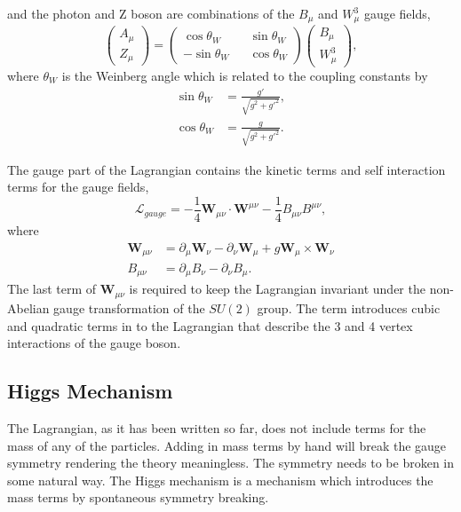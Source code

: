 and the photon and Z boson are combinations of the $B_{\mu}$ and $W^{3}_{\mu}$
gauge fields,
\begin{equation}
\left( \begin{matrix} A_{\mu}\\ Z_{\mu}\end{matrix}\right) =
\left( \begin{matrix} \cos\theta_{W} && \sin\theta_{W} \\  
                      -\sin\theta_{W} && \cos\theta_{W} \end{matrix}\right) 
\left( \begin{matrix} B_{\mu}\\ W^{3}_{\mu}\end{matrix}\right) ,
\label{eq:bgauge}
\end{equation}
where $\theta_{W}$ is the Weinberg angle which is related to the coupling
constants by
\begin{align*}
\sin\theta_{W} &= \frac{g\prime}{\sqrt{g^{2}+g\prime^{2}}},\\
\cos\theta_{W} &= \frac{g}{\sqrt{g^{2}+g\prime^{2}}}.
\end{align*}

The gauge part of the Lagrangian contains the kinetic terms and self interaction
terms for the gauge fields,
\begin{equation}
\mathcal{L}_{gauge} = 
- \frac{1}{4} \mathbf{W}_{\mu\nu} \cdot \mathbf{W}^{\mu\nu}
- \frac{1}{4} B_{\mu\nu} B^{\mu\nu},
\end{equation}
where
\begin{align*}
\mathbf{W}_{\mu\nu} &=
\partial_{\mu} \mathbf{W}_{\nu} -
\partial_{\nu} \mathbf{W}_{\mu} +
g \mathbf{W}_{\mu} \times \mathbf{W}_{\nu}\\
B_{\mu\nu} &= 
\partial_{\mu} B_{\nu}-
\partial_{\nu} B_{\mu}.
\end{align*}
The last term of $\mathbf{W}_{\mu\nu}$ is required to keep the Lagrangian invariant
under the non-Abelian gauge transformation of the $SU(2)$ group. The term
introduces cubic and quadratic terms in to the Lagrangian that describe the 3 and 4
vertex interactions of the gauge boson.

\subsection{Higgs Mechanism}
The Lagrangian, as it has been written so far, does not include terms for the
mass of any of the particles. 
Adding in mass terms by hand will break the
gauge symmetry rendering the theory meaningless. The symmetry needs to be broken
in some natural way.
The Higgs mechanism is a mechanism which introduces the mass terms by
spontaneous symmetry breaking.

